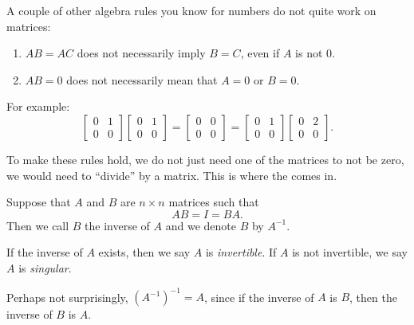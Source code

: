 \documentclass{ximera}
\begin{document}
A couple of other algebra rules you know for numbers do not quite work on matrices:
\begin{enumerate}
    \item $AB = AC$ does not necessarily imply $B=C$, even if $A$ is not 0.
    \item $AB = 0$ does not necessarily mean that $A=0$ or $B=0$.
\end{enumerate}
For example:
\begin{equation*}
    \begin{bmatrix} 
        0 & 1 \\ 
        0 & 0 
    \end{bmatrix}
    \begin{bmatrix} 
        0 & 1 \\ 
        0 & 0 
    \end{bmatrix}
    =
    \begin{bmatrix} 
        0 & 0 \\ 
        0 & 0 
    \end{bmatrix}
    =
    \begin{bmatrix} 
        0 & 1 \\ 
        0 & 0 
    \end{bmatrix}
    \begin{bmatrix} 
        0 & 2 \\ 
        0 & 0 
    \end{bmatrix} .
\end{equation*}

To make these rules hold, we do not just need one of the matrices to not be zero, we would need to ``divide'' by a matrix.  This is where the \emph{} comes in.

\begin{definition}
    Suppose that $A$ and $B$ are $n \times n$ matrices such that
    \begin{equation*}
        AB = I = BA .
    \end{equation*}
    Then we call $B$ the inverse of $A$ and we denote $B$ by $A^{-1}$.
    
    If the inverse of $A$ exists, then we say $A$ is \emph{invertible}. If $A$ is not invertible, we say $A$ is \emph{singular}.
\end{definition}

Perhaps not surprisingly, ${(A^{-1})}^{-1} = A$, since if the inverse of $A$ is $B$, then the inverse of $B$ is $A$.
\end{document}
